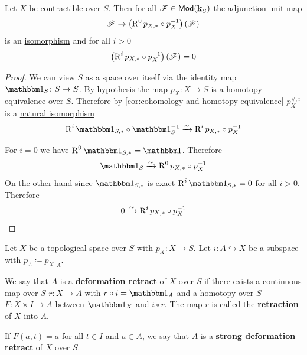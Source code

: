 \documentclass[../../main]{subfiles}
\begin{document}
\begin{corollary}\label{cor:cohomology-and-contractible}
  Let \(X\) be \hyperref[def:homotopy-over]{contractible over \(S\)}.
  Then for all \(\mathscr{F} \in \mathsf{Mod}(\underline{\mathbf{k}}_{S})\) the \hyperref[def:unit-counit]{adjunction unit map}
  \begin{equation*}
    \mathscr{F} \to \left(\operatorname{R}^{0}p_{X, \ast} \circ p_{X}^{-1} \right) \left( \mathscr{F} \right)
  \end{equation*}
  is an \hyperref[def:categorical-isomorphism]{isomorphism} and for all \(i > 0\)
  \begin{equation*}
    \left(\operatorname{R}^{i}p_{X, \ast} \circ p_{X}^{-1} \right) \left( \mathscr{F} \right) = 0
  \end{equation*}
\end{corollary}
\begin{proof}
  We can view \(S\) as a space over itself via the identity map \(\id_{S}\colon S \to S\).
  By hypothesis the map \(p_{X}\colon X \to S\) is a \hyperref[def:homotopy-over]{homotopy equivalence over \(S\)}.
  Therefore by \autoref{cor:cohomology-and-homotopy-equivalence} \(p_{X}^{\#, i}\) is a \hyperref[def:natural-transformation]{natural isomorphism}
  \begin{equation*}
    \operatorname{R}^{i}\id_{S, \ast} \circ \id_{S}^{-1} \isoarrow \operatorname{R}^{i}p_{X, \ast} \circ p_{X}^{-1}
  \end{equation*}

  For \(i = 0\) we have \(\operatorname{R}^{0}\id_{S, \ast} = \id\).
  Therefore
  \begin{equation*}
    \id_{S} \isoarrow \operatorname{R}^{0}p_{X, \ast} \circ p_{X}^{-1}
  \end{equation*}
  On the other hand since \(\id_{S, \ast}\) is \hyperref[def:exact-functor]{exact} \(\operatorname{R}^{i}\id_{S, \ast} = 0\) for all \(i > 0\).
  Therefore
  \begin{equation*}
    0 \xrightarrow{\sim} \operatorname{R}^{i}p_{X, \ast} \circ p_{X}^{-1} \qedhere
  \end{equation*}
\end{proof}

\begin{definition}\label{def:deformation-retract}
  Let \(X\) be a topological space over \(S\) with \(p_{X}\colon X \to S\).
  Let \(i\colon A \hookrightarrow X\) be a subspace with \(p_{A} \coloneq p_{X}|_{A}\).

  We say that \(A\) is a \textbf{deformation retract} of \(X\) over \(S\) if there exists a \hyperref[def:continuous-map-over]{continuous map over \(S\)} \(r\colon X \to A\) with \(r \circ i = \id_{A}\) and a \hyperref[def:homotopy-over]{homotopy over \(S\)} \(F\colon X \times I \to A\) between \(\id_{X}\) and \(i \circ r\).
  The map \(r\) is called the \textbf{retraction} of \(X\) into \(A\).

  If \(F(a, t) = a\) for all \(t \in I\) and \(a \in A\), we say that \(A\) is a \textbf{strong deformation retract} of \(X\) over \(S\).
\end{definition}
\end{document}
